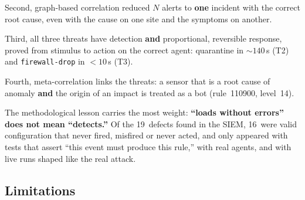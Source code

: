 \documentclass[11pt,a4paper]{article}
\begin{document}
Second, graph-based correlation reduced $N$ alerts to \textbf{one} incident with the correct
root cause, even with the cause on one site and the symptoms on another.

Third, all three threats have detection \textbf{and} proportional, reversible response,
proved from stimulus to action on the correct agent: quarantine in ${\sim}140$\,s (T2) and
\texttt{firewall-drop} in $< 10$\,s (T3).

Fourth, meta-correlation links the threats: a sensor that is a root cause of anomaly
\textbf{and} the origin of an impact is treated as a bot (rule~110900, level~14).

The methodological lesson carries the most weight: \textbf{``loads without errors'' does not
mean ``detects.''} Of the 19~defects found in the SIEM, 16~were valid configuration that
never fired, misfired or never acted, and only appeared with tests that assert ``this event
must produce this rule,'' with real agents, and with live runs shaped like the real attack.

\subsection{Limitations}
\end{document}

